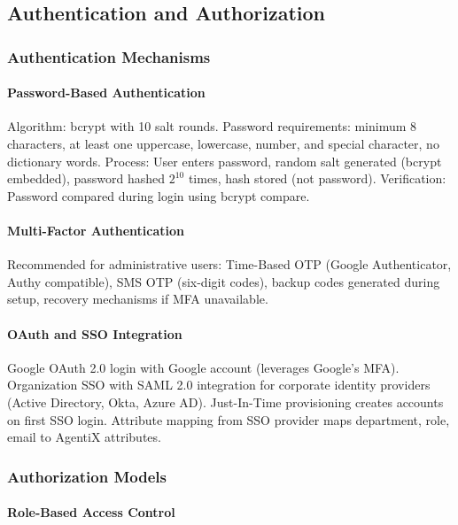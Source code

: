 \documentclass[12pt,oneside,openright,a4paper]{cpe-english-project}
\begin{document}
\vspace{1em}

\subsection{Authentication and Authorization}

\subsubsection{Authentication Mechanisms}

\paragraph{Password-Based Authentication}

Algorithm: bcrypt with 10 salt rounds. Password requirements: minimum 8 characters, at least one uppercase, lowercase, number, and special character, no dictionary words. Process: User enters password, random salt generated (bcrypt embedded), password hashed $2^{10}$ times, hash stored (not password). Verification: Password compared during login using bcrypt compare.

\paragraph{Multi-Factor Authentication}

Recommended for administrative users: Time-Based OTP (Google Authenticator, Authy compatible), SMS OTP (six-digit codes), backup codes generated during setup, recovery mechanisms if MFA unavailable.

\paragraph{OAuth and SSO Integration}

Google OAuth 2.0 login with Google account (leverages Google's MFA). Organization SSO with SAML 2.0 integration for corporate identity providers (Active Directory, Okta, Azure AD). Just-In-Time provisioning creates accounts on first SSO login. Attribute mapping from SSO provider maps department, role, email to AgentiX attributes.

\subsubsection{Authorization Models}

\paragraph{Role-Based Access Control}
\end{document}
